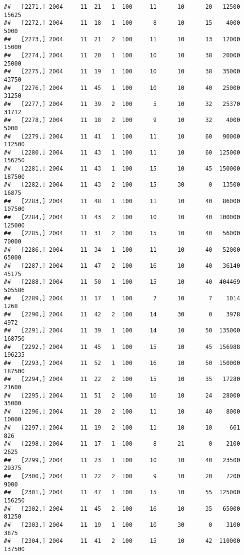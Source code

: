 \documentclass{article}\usepackage[]{graphicx}\usepackage[]{color}
\makeatletter
\newenvironment{kframe}{%
 \def\at@end@of@kframe{}%
 \ifinner\ifhmode%
  \def\at@end@of@kframe{\end{minipage}}%
  \begin{minipage}{\columnwidth}%
 \fi\fi%
 \def\FrameCommand##1{\hskip\@totalleftmargin \hskip-\fboxsep
 \colorbox{shadecolor}{##1}\hskip-\fboxsep
     \hskip-\linewidth \hskip-\@totalleftmargin \hskip\columnwidth}%
 \MakeFramed {\advance\hsize-\width
   \@totalleftmargin\z@ \linewidth\hsize
   \@setminipage}}%
 {\par\unskip\endMakeFramed%
 \at@end@of@kframe}
\newenvironment{knitrout}{}{} %
\makeatother
\begin{document}
\begin{knitrout}
\begin{kframe}
\begin{verbatim}
##   [2271,] 2004     11  21   1  100     11      10      20   12500   15625
##   [2272,] 2004     11  18   1  100      8      10      15    4000    5000
##   [2273,] 2004     11  21   2  100     11      10      13   12000   15000
##   [2274,] 2004     11  20   1  100     10      10      38   20000   25000
##   [2275,] 2004     11  19   1  100     10      10      38   35000   43750
##   [2276,] 2004     11  45   1  100     10      10      40   25000   31250
##   [2277,] 2004     11  39   2  100      5      10      32   25370   31712
##   [2278,] 2004     11  18   2  100      9      10      32    4000    5000
##   [2279,] 2004     11  41   1  100     11      10      60   90000  112500
##   [2280,] 2004     11  43   1  100     11      10      60  125000  156250
##   [2281,] 2004     11  43   1  100     15      10      45  150000  187500
##   [2282,] 2004     11  43   2  100     15      30       0   13500   16875
##   [2283,] 2004     11  48   1  100     11      10      40   86000  107500
##   [2284,] 2004     11  43   2  100     10      10      40  100000  125000
##   [2285,] 2004     11  31   2  100     15      10      40   56000   70000
##   [2286,] 2004     11  34   1  100     11      10      40   52000   65000
##   [2287,] 2004     11  47   2  100     16      10      40   36140   45175
##   [2288,] 2004     11  50   1  100     15      10      40  404469  505586
##   [2289,] 2004     11  17   1  100      7      10       7    1014    1268
##   [2290,] 2004     11  42   2  100     14      30       0    3978    4972
##   [2291,] 2004     11  39   1  100     14      10      50  135000  168750
##   [2292,] 2004     11  45   1  100     15      10      45  156988  196235
##   [2293,] 2004     11  52   1  100     16      10      50  150000  187500
##   [2294,] 2004     11  22   2  100     15      10      35   17280   21600
##   [2295,] 2004     11  51   2  100     10      10      24   28000   35000
##   [2296,] 2004     11  20   2  100     11      10      40    8000   10000
##   [2297,] 2004     11  19   2  100     11      10      10     661     826
##   [2298,] 2004     11  17   1  100      8      21       0    2100    2625
##   [2299,] 2004     11  23   1  100     10      10      40   23500   29375
##   [2300,] 2004     11  22   2  100      9      10      20    7200    9000
##   [2301,] 2004     11  47   1  100     15      10      55  125000  156250
##   [2302,] 2004     11  45   2  100     16      10      35   65000   81250
##   [2303,] 2004     11  19   1  100     10      30       0    3100    3875
##   [2304,] 2004     11  41   2  100     15      10      42  110000  137500

\end{verbatim}
\end{kframe}
\end{knitrout}
\end{document}
